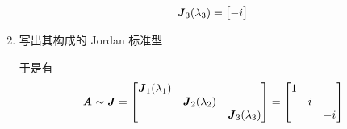 \begin{solution}
\begin{enumerate}
\begin{align*}
                                \textbf{\textit{J}}_3(\lambda_3) = \begin{bmatrix} -i \end{bmatrix} 
                            \end{align*}
                        \item 写出其构成的 Jordan 标准型
                            \par 于是有
                            \begin{align*}
                                \textbf{\textit{A}} \sim \textbf{\textit{J}} = \begin{bmatrix}
                                    \textbf{\textit{J}}_1(\lambda_1) & & \\ & \textbf{\textit{J}}_2(\lambda_2) & \\ & & \textbf{\textit{J}}_3(\lambda_3)
                                \end{bmatrix} = \begin{bmatrix}
                                    1 & & \\ & i & \\ & & -i
                                \end{bmatrix}
                            \end{align*}
                \end{enumerate}
            \end{solution}

